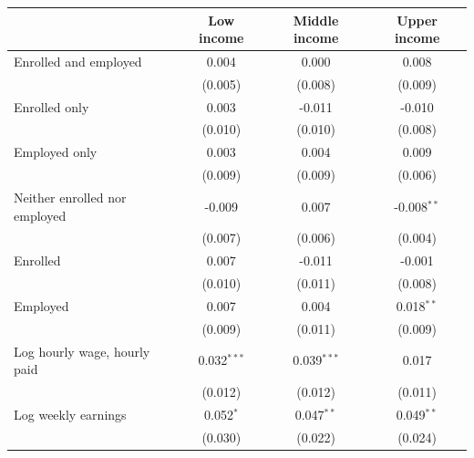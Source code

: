 \begin{tabular}{lccc}
\toprule
 & Low income & Middle income & Upper income \\
\midrule
Enrolled and employed & 0.004 & 0.000 & 0.008 \\
 & (0.005) & (0.008) & (0.009) \\
Enrolled only & 0.003 & -0.011 & -0.010 \\
 & (0.010) & (0.010) & (0.008) \\
Employed only & 0.003 & 0.004 & 0.009 \\
 & (0.009) & (0.009) & (0.006) \\
Neither enrolled nor employed & -0.009 & 0.007 & -0.008$^{**}$ \\
 & (0.007) & (0.006) & (0.004) \\
Enrolled & 0.007 & -0.011 & -0.001 \\
 & (0.010) & (0.011) & (0.008) \\
Employed & 0.007 & 0.004 & 0.018$^{**}$ \\
 & (0.009) & (0.011) & (0.009) \\
Log hourly wage, hourly paid & 0.032$^{***}$ & 0.039$^{***}$ & 0.017 \\
 & (0.012) & (0.012) & (0.011) \\
Log weekly earnings & 0.052$^{*}$ & 0.047$^{**}$ & 0.049$^{**}$ \\
 & (0.030) & (0.022) & (0.024) \\
\bottomrule
\end{tabular}
